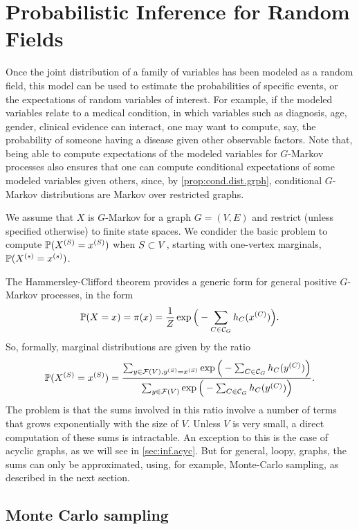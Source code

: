 \chapter[Probabilistic Inference for MRF]{Probabilistic Inference for  Random Fields}
\label{chap:inf.mrf}

Once the joint distribution of a family of variables has been modeled as a random field,  this model can be used to estimate the probabilities
 of specific events, or the expectations of random variables of interest. 
 For
example, if the modeled variables relate to  a medical condition, in
which variables such as diagnosis, age, gender, clinical evidence can
interact, one may want to compute, say, the probability  of someone having a disease given other observable
factors. Note that, being able to
compute expectations of the modeled variables for $G$-Markov processes also ensures that one can
compute conditional expectations of some modeled variables given others, since, by 
\cref{prop:cond.dist.grph}, conditional $G$-Markov distributions are
Markov over restricted graphs.

We assume  that $X$ is $G$-Markov for a graph $G = (V,E)$ and restrict (unless specified otherwise) to finite state spaces. We condider the basic problem to compute $\bm{\mathbb P}(X^{(S)} =x^{(S)})$ when $S\subset V$, starting with one-vertex marginals, $\bm{\mathbb P}(X^{(s)}= x^{(s)})$. 

The Hammersley-Clifford theorem provides a generic form for general
positive $G$-Markov processes, in the form
\begin{equation}
\label{eq:gibbs.inference}
\bm{\mathbb P}(X=x) = \pi(x) =  \frac{1}{Z} \exp\Big(-\sum_{C\in \mathcal C_G}
h_C(x^{(C)})\Big).
\end{equation}
So, formally, marginal distributions are given by the ratio 
\[
\bm{\mathbb P}(X^{(S)} = x^{(S)}) = \frac{\sum_{y\in {\mathcal F}(V), y^{(S)}= x^{(S)}} \exp\Big(-\sum_{C\in \mathcal C_G}
h_C(y^{(C)})\Big)}{\sum_{y\in {\mathcal F}(V)} \exp\Big(-\sum_{C\in \mathcal C_G}
h_C(y^{(C)})\Big)}.
\]
The problem is that the sums involved in this ratio involve a number
of terms
that grows exponentially with the size of $V$. Unless $V$ is very
small, a direct computation of these sums is intractable. An exception
to this is the case of acyclic graphs, as we will see in \cref{sec:inf.acyc}. But for
general, loopy, graphs, the sums can only be approximated, using, for example,
Monte-Carlo sampling, as described in the next section.

\section{Monte Carlo sampling}

